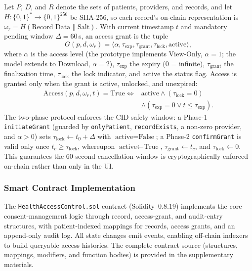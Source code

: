 \documentclass[journal,onecolumn]{IEEEtran}
\begin{document}
Let $P$, $D$, and $R$ denote the sets of patients, providers, and records, and let $H:\{0,1\}^*\!\rightarrow\{0,1\}^{256}$ be SHA-256, so each record's on-chain representation is $\omega_r = H(\text{Record Data}\parallel\text{Salt})$. With current timestamp $t$ and mandatory pending window $\Delta = 60$\,s, an access grant is the tuple
\begin{equation}
\label{eq:grant}
G(p,d,\omega_r)=\langle \alpha,\tau_{\text{exp}},\tau_{\text{grant}},\tau_{\text{lock}},\text{active}\rangle,
\end{equation}
where $\alpha$ is the access level (the prototype implements View-Only, $\alpha=1$; the model extends to Download, $\alpha=2$), $\tau_{\text{exp}}$ the expiry ($0$ = infinite), $\tau_{\text{grant}}$ the finalization time, $\tau_{\text{lock}}$ the lock indicator, and $\text{active}$ the status flag. Access is granted only when the grant is active, unlocked, and unexpired:
\begin{equation}
\label{eq:access-check}
\begin{aligned}
\text{Access}(p,d,\omega_r,t)=\text{True}\iff{}&\text{active}\land(\tau_{\text{lock}}=0)\\
&\land(\tau_{\text{exp}}=0\lor t\le\tau_{\text{exp}}).
\end{aligned}
\end{equation}
The two-phase protocol enforces the CID safety window: a Phase-1 \texttt{initiateGrant} (guarded by \texttt{onlyPatient}, \texttt{recordExists}, a non-zero provider, and $\alpha>0$) sets $\tau_{\text{lock}}\leftarrow t_0+\Delta$ with $\text{active}=\text{False}$; a Phase-2 \texttt{confirmGrant} is valid only once $t_c\ge\tau_{\text{lock}}$, whereupon $\text{active}\leftarrow\text{True}$, $\tau_{\text{grant}}\leftarrow t_c$, and $\tau_{\text{lock}}\leftarrow 0$. This guarantees the 60-second cancellation window is cryptographically enforced on-chain rather than only in the UI.

\subsubsection{Smart Contract Implementation}

The \texttt{HealthAccessControl.sol} contract (Solidity~0.8.19) implements the core consent-management logic through record, access-grant, and audit-entry structures, with patient-indexed mappings for records, access grants, and an append-only audit log. All state changes emit events, enabling off-chain indexers to build queryable access histories. The complete contract source (structures, mappings, modifiers, and function bodies) is provided in the supplementary materials.
\end{document}
